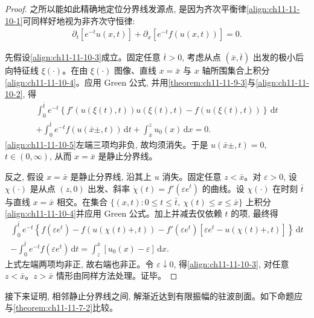 \documentclass[../../main.tex]{subfiles}
\begin{document}
\begin{proof}
之所以能如此精确地定位分界线发源点, 是因为齐次平衡律\eqref{align:ch11-11-10-1}可同样好地视为非齐次守恒律:
\begin{align}
\partial_t\left[e^{-t}u(x,t)\right]+\partial_x\left[e^{-t}f(u(x,t))\right]=0.\label{align:ch11-11-10-4}
\end{align}

先假设\eqref{align:ch11-11-10-3}成立。固定任意 $\bar t>0$, 考虑从点 $(\bar x,\bar t)$ 出发的极小后向特征线 $\xi(\cdot)$。在由 $\xi(\cdot)$ 图像、直线 $x=\bar x$ 与 $x$ 轴所围集合上积分\eqref{align:ch11-11-10-4}。应用 Green 公式, 并用\cref{theorem:ch11-11-9-3}与\eqref{align:ch11-11-10-2}, 得
\begin{align}
\int_0^{\bar t}e^{-t}\left\{f'(u(\xi(t),t))u(\xi(t),t)-f(u(\xi(t),t))\right\}\,\mathrm{d}t\nonumber\\
+\int_0^{\bar t}e^{-t}f(u(\bar x\pm,t))\,\mathrm{d}t+\int_{\bar x}^{z}u_0(x)\,\mathrm{d}x=0.\label{align:ch11-11-10-5}
\end{align}
\eqref{align:ch11-11-10-5}左端三项均非负, 故均须消失。于是 $u(\bar x\pm,t)=0$, $t\in(0,\infty)$, 从而 $x=\bar x$ 是静止分界线。

反之, 假设 $x=\bar x$ 是静止分界线, 沿其上 $u$ 消失。固定任意 $z<\bar x$。对 $\varepsilon>0$, 设 $\chi(\cdot)$ 是从点 $(z,0)$ 出发、斜率 $\dot{\chi}(t)=f'(\varepsilon e^t)$ 的曲线。设 $\chi(\cdot)$ 在时刻 $\bar t$ 与直线 $x=\bar x$ 相交。在集合 $\{(x,t):0\leqslant t\leqslant\bar t,\ \chi(t)\leqslant x\leqslant\bar x\}$ 上积分\eqref{align:ch11-11-10-4}并应用 Green 公式。加上并减去仅依赖 $t$ 的项, 最终得
\begin{align}
\int_0^{\bar t}e^{-t}\left\{f(\varepsilon e^t)-f(u(\chi(t)+,t))-f'(\varepsilon e^t)\left[\varepsilon e^t-u(\chi(t)+,t)\right]\right\}\,\mathrm{d}t\nonumber\\
-\int_0^{\bar t}e^{-t}f(\varepsilon e^t)\,\mathrm{d}t=\int_z^{\bar x}[u_0(x)-\varepsilon]\,\mathrm{d}x.\label{align:ch11-11-10-6}
\end{align}
上式左端两项均非正, 故右端也非正。令 $\varepsilon\downarrow0$, 得\eqref{align:ch11-11-10-3}, 对任意 $z<\bar x$。$z>\bar x$ 情形由同样方法处理。证毕。
\end{proof}

接下来证明, 相邻静止分界线之间, 解渐近达到有限振幅的驻波剖面。如下命题应与\cref{theorem:ch11-11-7-2}比较。
\end{document}

